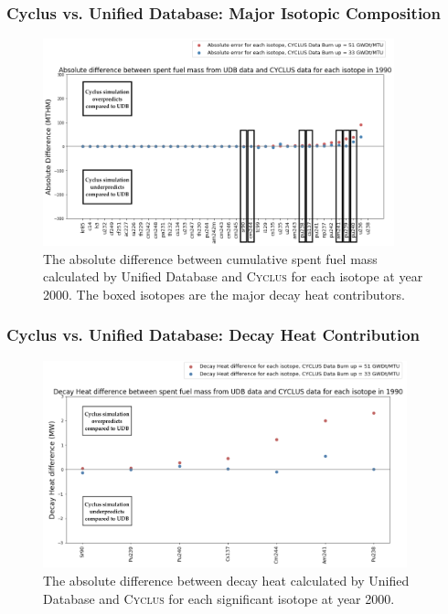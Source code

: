 \begin{frame}
    \frametitle{Cyclus vs. Unified Database: Major Isotopic Composition}
    \begin{figure}[htbp!]
        \begin{center}
          \includegraphics[height=6cm]{../figures/absolute_diff_1990_annotated}
        \end{center}
              \caption{The absolute difference between cumulative spent fuel mass calculated by 
              Unified Database and \textsc{Cyclus} for each isotope at year 2000. The boxed isotopes are the major decay heat contributors.}
        \label{fig:totalmass}
      \end{figure}
\end{frame}

\begin{frame}
  \frametitle{Cyclus vs. Unified Database: Decay Heat Contribution}
  \begin{figure}[htbp!]
      \begin{center}
        \includegraphics[height=6cm]{../figures/absolute_diff_1990_decayheat}
      \end{center}
            \caption{The absolute difference between decay heat calculated by 
            Unified Database and \textsc{Cyclus} for each significant isotope at year 2000. 
            }
    \end{figure}
\end{frame}